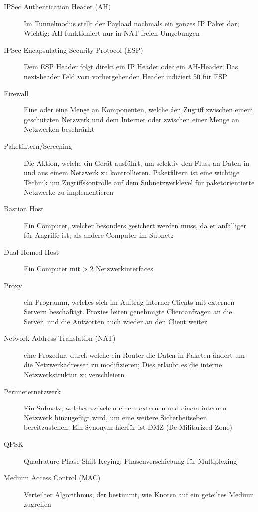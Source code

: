 \documentclass[10pt,landscape]{article}
\begin{document}
\begin{multicols}{3}
\begin{description}
    \item[IPSec Authentication Header (AH)] Im Tunnelmodus stellt der Payload nochmals ein ganzes IP Paket dar; Wichtig: AH funktioniert nur in NAT freien Umgebungen
    \item[IPSec Encapsulating Security Protocol (ESP)] Dem ESP Header folgt direkt ein IP Header oder ein AH-Header; Das next-header Feld vom vorhergehenden Header indiziert 50 für ESP
    \item[Firewall] Eine oder eine Menge an Komponenten, welche den Zugriff zwischen einem geschützten Netzwerk und dem Internet oder zwischen einer Menge an Netzwerken beschränkt
    \item[Paketfiltern/Screening] Die Aktion, welche ein Gerät ausführt, um selektiv den Fluss an Daten in und aus einem Netzwerk zu kontrollieren. Paketfiltern ist eine wichtige Technik um Zugriffskontrolle auf dem Subnetzwerklevel für paketorientierte Netzwerke zu implementieren
    \item[Bastion Host] Ein Computer, welcher besonders gesichert werden muss, da er anfälliger für Angriffe ist, als andere Computer im Subnetz
    \item[Dual Homed Host] Ein Computer mit > 2 Netzwerkinterfaces
    \item[Proxy] ein Programm, welches sich im Auftrag interner Clients mit externen Servern beschäftigt. Proxies leiten genehmigte Clientanfragen an die Server, und die Antworten auch wieder an den Client weiter
    \item[Network Address Translation (NAT)] eine Prozedur, durch welche ein Router die Daten in Paketen ändert um die Netzwerkadressen zu modifizieren; Dies erlaubt es die interne Netzwerkstruktur zu verschleiern
    \item[Perimeternetzwerk] Ein Subnetz, welches zwischen einem externen und einem internen Netzwerk hinzugefügt wird, um eine weitere Sicherheitseben bereitzustellen; Ein Synonym hierfür ist DMZ (De Militarized Zone)
    \item[QPSK] Quadrature Phase Shift Keying; Phasenverschiebung für Multiplexing
    \item[Medium Access Control (MAC)] Verteilter Algorithmus, der bestimmt, wie Knoten auf ein geteiltes Medium zugreifen
\end{description}

\end{multicols}
\end{document}
